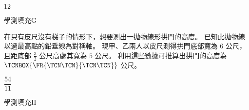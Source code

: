 \begin{QUESTIONS}
\begin{QUESTION}
\begin{QBODY}
        \end{QBODY}
        \begin{QFROMS}
        \end{QFROMS}
        \begin{QTAGS}\end{QTAGS}
        \begin{QANS}
            $12$
        \end{QANS}
        \begin{QSOLLIST}
        \end{QSOLLIST}
        \begin{QEMPTYSPACE}
        \end{QEMPTYSPACE}
    \end{QUESTION}
    \begin{QUESTION}
        \begin{ExamInfo}{92}{學測}{填充}{G}
        \end{ExamInfo}
        \begin{ExamAnsRateInfo}{15}{41}{4}{0}
        \end{ExamAnsRateInfo}
        \begin{QBODY}
            在只有皮尺沒有梯子的情形下，想要測出一拋物線形拱門的高度。
            已知此拋物線以過最高點的鉛垂線為對稱軸。
            現甲、乙兩人以皮尺測得拱門底部寬為 $6$ 公尺，且距底部 $\frac{3}{2}$ 公尺高處其寬為 $5$ 公尺。
            利用這些數據可推算出拱門的高度為$\TCNBOX{\FR{\TCN\TCN}{\TCN\TCN}}$ 公尺。
        \end{QBODY}
        \begin{QFROMS}
        \end{QFROMS}
        \begin{QTAGS}\end{QTAGS}
        \begin{QANS}
            $\dfrac{54}{11}$
        \end{QANS}
        \begin{QSOLLIST}
        \end{QSOLLIST}
        \begin{QEMPTYSPACE}
        \end{QEMPTYSPACE}
    \end{QUESTION}
    \begin{QUESTION}
        \begin{ExamInfo}{92}{學測}{填充}{H}
        \end{ExamInfo}

\end{QUESTION}
\end{QUESTIONS}
